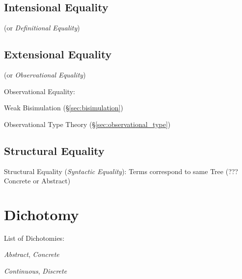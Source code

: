 \subsection{Intensional Equality}\label{sec:intensional_equality}

(or \emph{Definitional Equality})



\subsection{Extensional Equality}\label{sec:extensional_equality}

(or \emph{Observational Equality})

Observational Equality: %

Weak Bisimulation (\S\ref{sec:bisimulation})

Observational Type Theory (\S\ref{sec:observational_type})



\subsection{Structural Equality}\label{sec:structural_equality}

Structural Equality (\emph{Syntactic Equality}): Terms correspond to
same Tree (??? Concrete or Abstract)



\section{Dichotomy}\label{sec:dichotomy}

List of Dichotomies:

\emph{Abstract}, \emph{Concrete}

\emph{Continuous}, \emph{Discrete} %

